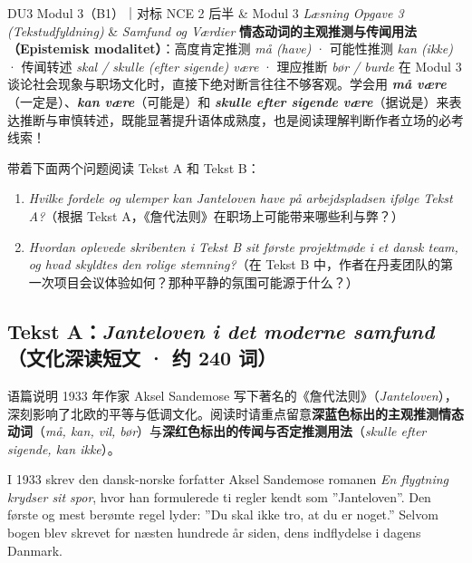 {DU3 Modul 3（B1）｜对标 NCE 2 后半 \& Modul 3 \textit{Læsning Opgave 3 (Tekstudfyldning)} \& \textit{Samfund og Værdier}}
{\textbf{情态动词的主观推测与传闻用法（Epistemisk modalitet）}：高度肯定推测 \textit{må (have)} · 可能性推测 \textit{kan (ikke)} · 传闻转述 \textit{skal / skulle (efter sigende) være} · 理应推断 \textit{bør / burde}}
{在 Modul 3 谈论社会现象与职场文化时，直接下绝对断言往往不够客观。学会用 \textbf{\textit{må være}}（一定是）、\textbf{\textit{kan være}}（可能是）和 \textbf{\textit{skulle efter sigende være}}（据说是）来表达推断与审慎转述，既能显著提升语体成熟度，也是阅读理解判断作者立场的必考线索！}

\begin{foerduleaeser}
带着下面两个问题阅读 Tekst A 和 Tekst B：
\begin{enumerate}
  \item \textit{Hvilke fordele og ulemper kan Janteloven have på arbejdspladsen ifølge Tekst A?}（根据 Tekst A，《詹代法则》在职场上可能带来哪些利与弊？）
  \item \textit{Hvordan oplevede skribenten i Tekst B sit første projektmøde i et dansk team, og hvad skyldtes den rolige stemning?}（在 Tekst B 中，作者在丹麦团队的第一次项目会议体验如何？那种平静的氛围可能源于什么？）
\end{enumerate}
\end{foerduleaeser}


\subsection*{Tekst A：\textit{Janteloven i det moderne samfund}（文化深读短文 · 约 240 词）}

\begin{tipbox}{语篇说明}
1933 年作家 Aksel Sandemose 写下著名的《詹代法则》（\textit{Janteloven}），深刻影响了北欧的平等与低调文化。阅读时请重点留意\textbf{\color{NCDNavy}深蓝色标出的主观推测情态动词}（\textit{må, kan, vil, bør}）与\textbf{\color{NCDRed}深红色标出的传闻与否定推测用法}（\textit{skulle efter sigende, kan ikke}）。
\end{tipbox}

I 1933 skrev den dansk-norske forfatter Aksel Sandemose romanen \textit{En flygtning krydser sit spor}, hvor han formulerede ti regler kendt som ”Janteloven”. Den første og mest berømte regel lyder: ”Du skal ikke tro, at du er noget.” Selvom bogen blev skrevet for næsten hundrede år siden,  dens indflydelse i dagens Danmark.

